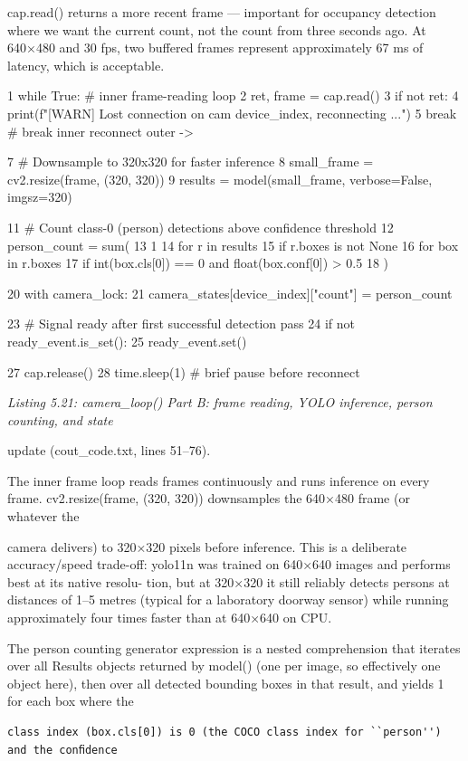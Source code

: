 cap.read() returns a more recent frame --- important for occupancy detection where we
want the current count, not the count from three seconds ago. At 640×480 and 30 fps, two
buffered frames represent approximately 67 ms of latency, which is acceptable.

1 while True: \# inner frame-reading loop
2 ret, frame = cap.read()
3 if not ret:
4 print(f"[WARN] Lost connection on cam {device\_index}, reconnecting
...")
5 break \# break inner reconnect outer ->

7 \# Downsample to 320x320 for faster inference
8 small\_frame = cv2.resize(frame, (320, 320))
9 results = model(small\_frame, verbose=False, imgsz=320)

11 \# Count class-0 (person) detections above confidence threshold
12 person\_count = sum(
13 1
14 for r in results
15 if r.boxes is not None
16 for box in r.boxes
17 if int(box.cls[0]) == 0 and float(box.conf[0]) > 0.5
18 )

20 with camera\_lock:
21 camera\_states[device\_index]["count"] = person\_count


23 \# Signal ready after first successful detection pass
24 if not ready\_event.is\_set():
25 ready\_event.set()


27 cap.release()
28 time.sleep(1) \# brief pause before reconnect


\textit{Listing 5.21: camera\_loop() Part B: frame reading, YOLO inference, person counting, and state}

update (cout\_code.txt, lines 51--76).


The inner frame loop reads frames continuously and runs inference on every frame.
cv2.resize(frame, (320, 320)) downsamples the 640×480 frame (or whatever the



camera delivers) to 320×320 pixels before inference. This is a deliberate accuracy/speed
trade-off: yolo11n was trained on 640×640 images and performs best at its native resolu-
tion, but at 320×320 it still reliably detects persons at distances of 1--5 metres (typical for a
laboratory doorway sensor) while running approximately four times faster than at 640×640
on CPU.

The person counting generator expression is a nested comprehension that iterates over
all Results objects returned by model() (one per image, so effectively one object here),
then over all detected bounding boxes in that result, and yields 1 for each box where the
\begin{lstlisting}
class index (box.cls[0]) is 0 (the COCO class index for ``person'') and the conﬁdence
\end{lstlisting}

